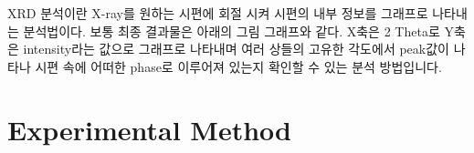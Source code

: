 \documentclass[a4paper, 10pt, nanum]{CSUniSchoolLabReport}
\begin{document}
	XRD 분석이란 X-ray를 원하는 시편에 회절 시켜 시편의 내부 정보를 그래프로 나타내는 분석법이다. 보통 최종 결과물은 아래의 그림 그래프와 같다. X축은 2 Theta로 Y축은 intensity라는 값으로 그래프로 나타내며 여러 상들의 고유한 각도에서 peak값이 나타나 시편 속에 어떠한 phase로 이루어져 있는지 확인할 수 있는 분석 방법입니다.


\section{Experimental Method}

\end{document}
